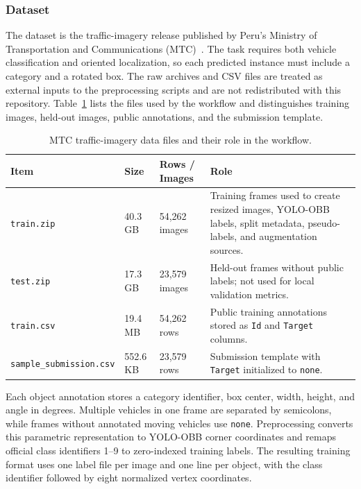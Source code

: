 \subsubsection{Dataset}
\label{sec:dataset}

The dataset is the traffic-imagery release published by Peru's Ministry of Transportation and Communications (MTC)~\cite{MTC2026SmartChallenge}. The task requires both vehicle classification and oriented localization, so each predicted instance must include a category and a rotated box. The raw archives and CSV files are treated as external inputs to the preprocessing scripts and are not redistributed with this repository. Table~\ref{tab:dataset_structure} lists the files used by the workflow and distinguishes training images, held-out images, public annotations, and the submission template.

\begin{table}[!t]
  \caption{MTC traffic-imagery data files and their role in the workflow.}
  \label{tab:dataset_structure}
  \centering
  \small
  \begin{tabular}{p{} p{} p{} p{}}
    \toprule
    \textbf{Item} & \textbf{Size} & \textbf{Rows / Images} & \textbf{Role} \\
    \midrule
    \texttt{train.zip} & 40.3 GB & 54,262 images & Training frames used to create resized images, YOLO-OBB labels, split metadata, pseudo-labels, and augmentation sources. \\
    \texttt{test.zip} & 17.3 GB & 23,579 images & Held-out frames without public labels; not used for local validation metrics. \\
    \texttt{train.csv} & 19.4 MB & 54,262 rows & Public training annotations stored as \texttt{Id} and \texttt{Target} columns. \\
    \texttt{sample\_submission.csv} & 552.6 KB & 23,579 rows & Submission template with \texttt{Target} initialized to \texttt{none}. \\
    \bottomrule
  \end{tabular}
\end{table}

Each object annotation stores a category identifier, box center, width, height, and angle in degrees. Multiple vehicles in one frame are separated by semicolons, while frames without annotated moving vehicles use \texttt{none}. Preprocessing converts this parametric representation to YOLO-OBB corner coordinates and remaps official class identifiers 1--9 to zero-indexed training labels. The resulting training format uses one label file per image and one line per object, with the class identifier followed by eight normalized vertex coordinates.

